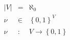 \documentclass{standalone}
\begin{document}
$
\begin{array}{rcl}
\left|V\right| & =   & \aleph_0^{}                      \\
\nu            & \in & \left\{0,1\right\}_{}^V          \\
\nu            & :   & V\rightarrow{}\left\{0,1\right\} \\
\end{array}
$
\end{document}
